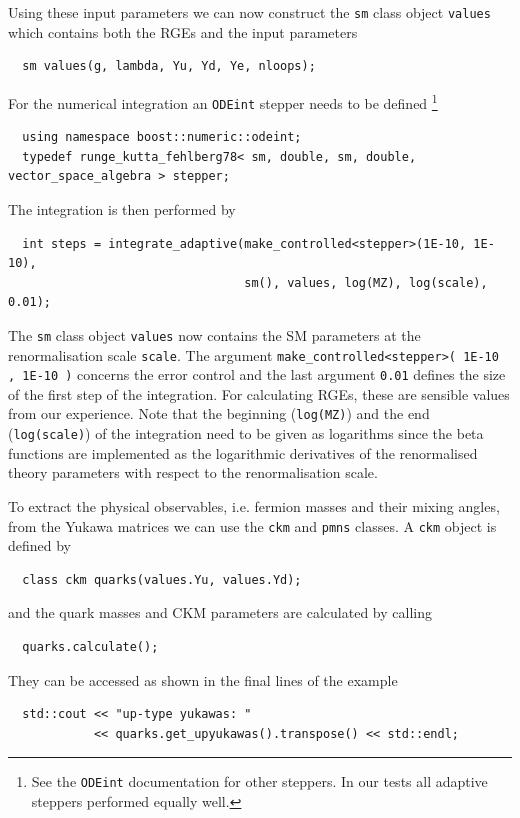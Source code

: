 \documentclass[11pt,a4paper]{article}
\begin{document}
Using these input parameters we can now construct the \texttt{sm} class object \texttt{values} which contains both the RGEs and the input parameters
\begin{lstlisting}
  sm values(g, lambda, Yu, Yd, Ye, nloops);
\end{lstlisting}
For the numerical integration an \texttt{ODEint} stepper needs to be defined \footnote{See the \texttt{ODEint} documentation for other steppers. In our tests all adaptive steppers performed equally well.}
\begin{lstlisting}
  using namespace boost::numeric::odeint;
  typedef runge_kutta_fehlberg78< sm, double, sm, double, vector_space_algebra > stepper;
\end{lstlisting}
The integration is then performed by
\begin{lstlisting}
  int steps = integrate_adaptive(make_controlled<stepper>(1E-10, 1E-10),
                                 sm(), values, log(MZ), log(scale), 0.01);
\end{lstlisting}
The \texttt{sm} class object \texttt{values} now contains the SM parameters at the renormalisation scale \texttt{scale}. The argument \texttt{make\_controlled<stepper>( 1E-10 , 1E-10 )} concerns the error control
and the last argument \texttt{0.01} defines the size of the first step of the integration. For calculating RGEs, these are sensible values from our experience.
Note that the beginning (\texttt{log(MZ)}) and the end (\texttt{log(scale)}) of the integration need to be given as logarithms since the beta functions are implemented as the logarithmic derivatives of the
renormalised theory parameters with respect to the renormalisation scale.

To extract the physical observables, i.e. fermion masses and their mixing angles,  from the Yukawa matrices we can use the \texttt{ckm} and \texttt{pmns} classes. A \texttt{ckm} object is defined by
\begin{lstlisting}
  class ckm quarks(values.Yu, values.Yd);
\end{lstlisting}
and the quark masses and CKM parameters are calculated by calling
\begin{lstlisting}
  quarks.calculate();
\end{lstlisting}
They can be accessed as shown in the final lines of the example
\begin{lstlisting}
  std::cout << "up-type yukawas: "
            << quarks.get_upyukawas().transpose() << std::endl;
\end{lstlisting}
\end{document}
